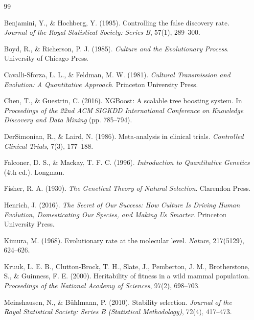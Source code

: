 \documentclass[11pt]{article}
\begin{document}
\begin{thebibliography}{99}

Benjamini, Y., \& Hochberg, Y. (1995). Controlling the false discovery rate.
\textit{Journal of the Royal Statistical Society: Series B}, 57(1), 289--300.

Boyd, R., \& Richerson, P. J. (1985). \textit{Culture and the Evolutionary
Process}. University of Chicago Press.

Cavalli-Sforza, L. L., \& Feldman, M. W. (1981). \textit{Cultural Transmission and
Evolution: A Quantitative Approach}. Princeton University Press.

Chen, T., \& Guestrin, C. (2016). XGBoost: A scalable tree boosting system. In
\textit{Proceedings of the 22nd ACM SIGKDD International Conference on Knowledge
Discovery and Data Mining} (pp. 785--794).

DerSimonian, R., \& Laird, N. (1986). Meta-analysis in clinical trials.
\textit{Controlled Clinical Trials}, 7(3), 177--188.

Falconer, D. S., \& Mackay, T. F. C. (1996). \textit{Introduction to Quantitative
Genetics} (4th ed.). Longman.

Fisher, R. A. (1930). \textit{The Genetical Theory of Natural Selection}. Clarendon
Press.

Henrich, J. (2016). \textit{The Secret of Our Success: How Culture Is Driving Human
Evolution, Domesticating Our Species, and Making Us Smarter}. Princeton University
Press.

Kimura, M. (1968). Evolutionary rate at the molecular level. \textit{Nature},
217(5129), 624--626.

Kruuk, L. E. B., Clutton-Brock, T. H., Slate, J., Pemberton, J. M., Brotherstone,
S., \& Guinness, F. E. (2000). Heritability of fitness in a wild mammal population.
\textit{Proceedings of the National Academy of Sciences}, 97(2), 698--703.

Meinshausen, N., \& B\"uhlmann, P. (2010). Stability selection. \textit{Journal of
the Royal Statistical Society: Series B (Statistical Methodology)}, 72(4), 417--473.


\end{thebibliography}
\end{document}
